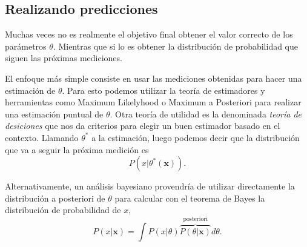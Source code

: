 \subsection{Realizando predicciones}
Muchas veces no es realmente el objetivo final obtener el valor correcto de los par\'ametros $\theta$. Mientras que si lo es obtener la distribuci\'on de probabilidad que siguen las pr\'oximas mediciones.

El enfoque m\'as simple consiste en usar las mediciones obtenidas para hacer una estimaci\'on de $\theta$. Para esto podemos utilizar la teor\'ia de estimadores y herramientas como Maximum Likelyhood o Maximum a Posteriori para realizar una estimaci\'on puntual de $\theta$. Otra teor\'ia de utilidad es la denominada {\it teor\'ia de desiciones} que nos da criterios para elegir un buen estimador basado en el contexto. Llamando $\theta^*$ a la estimaci\'on, luego podemos decir que la distribuci\'on que va a seguir la pr\'oxima medici\'on es 
\begin{equation}
    P(x|\theta^*(\mathbf{x})).
\end{equation}

Alternativamente, un an\'alisis bayesiano provendr\'ia de utilizar directamente la distribuci\'on a posteriori de $\theta$ para calcular con el teorema de Bayes la distribuci\'on de probabilidad de $x$,
\begin{equation}
    P(x|\mathbf{x}) = \int P(x|\theta)\overbrace{P(\theta|\mathbf{x})}^\text{posteriori}d\theta.
\end{equation}



